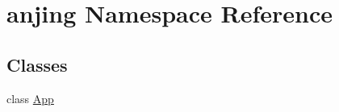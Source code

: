 \hypertarget{namespaceanjing}{}\section{anjing Namespace Reference}
\label{namespaceanjing}
\subsection*{Classes}
\begin{DoxyCompactItemize}
\item 
class \hyperlink{classanjing_1_1_app}{App}
\end{DoxyCompactItemize}
